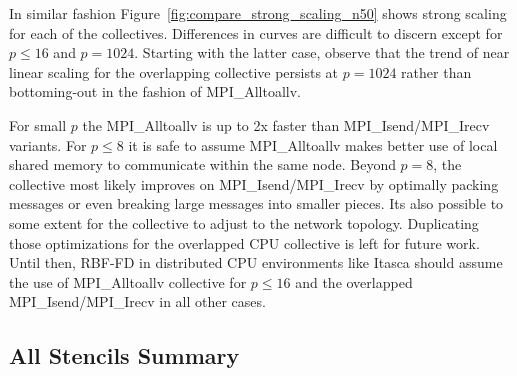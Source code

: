 \documentclass{report}
\begin{document}
In similar fashion Figure~\ref{fig:compare_strong_scaling_n50} shows strong scaling for each of the collectives. Differences in curves are difficult to discern except for $p \leq 16$ and $p = 1024$. Starting with the latter case, observe that the trend of near linear scaling for the overlapping collective persists at $p=1024$ rather than bottoming-out in the fashion of MPI\_Alltoallv. 

For small $p$ the MPI\_Alltoallv is up to 2x faster than MPI\_Isend/MPI\_Irecv variants. For $p\leq8$ it is safe to assume MPI\_Alltoallv makes better use of local shared memory to communicate within the same node. Beyond $p=8$, the collective most likely improves on MPI\_Isend/MPI\_Irecv by optimally packing messages or even breaking large messages into smaller pieces. Its also possible to some extent for the collective to adjust to the network topology. Duplicating those optimizations for the overlapped CPU collective is left for future work. Until then, RBF-FD in distributed CPU environments like Itasca should assume the use of MPI\_Alltoallv collective for $p \leq 16$ and the overlapped MPI\_Isend/MPI\_Irecv in all other cases. 

\subsection{All Stencils Summary}
\end{document}
